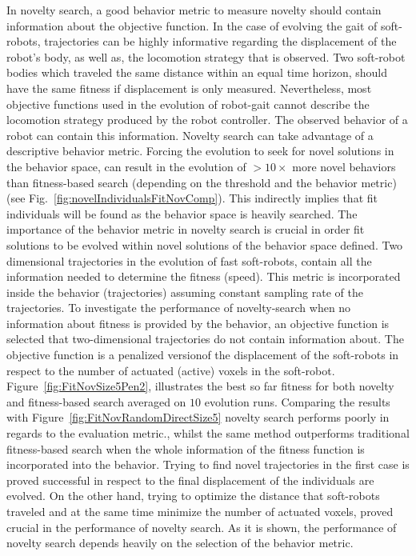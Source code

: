 In novelty search, a good behavior metric to measure novelty should contain information about the objective function. In the case of evolving the gait of soft-robots, trajectories can be highly informative regarding the displacement of the robot's body, as well as, the locomotion strategy that is observed. Two soft-robot bodies which traveled the same distance within an equal time horizon, should have the same fitness if displacement is only measured. Nevertheless, most objective functions used in the evolution of robot-gait cannot describe the locomotion strategy produced by the robot controller. The observed behavior of a robot can contain this information. Novelty search can take advantage of a descriptive behavior metric. Forcing the evolution to seek for  novel solutions in the behavior space, can result in the evolution of $>10 \times$ more novel behaviors than fitness-based search (depending on the threshold and the behavior metric) (see Fig.~\ref{fig:novelIndividualsFitNovComp}). This indirectly implies that fit individuals will be found as the behavior space is heavily searched. The importance of the behavior metric in novelty search is crucial in order fit solutions to be evolved within novel solutions of the behavior space defined. Two dimensional trajectories in the evolution of fast soft-robots, contain all the information needed to determine the fitness (speed). This metric is incorporated inside the behavior (trajectories) assuming constant sampling rate of the trajectories. To investigate the performance of novelty-search when no information about fitness is provided by the behavior, an objective function is selected that two-dimensional trajectories do not contain information about. The objective function is a penalized version\footnotemark of the displacement of the soft-robots in respect to the number of actuated (active) voxels in the soft-robot. Figure~\ref{fig:FitNovSize5Pen2}, illustrates the best so far fitness for both novelty and fitness-based search averaged on $10$ evolution runs. Comparing the results with Figure~\ref{fig:FitNovRandomDirectSize5} novelty search performs poorly in regards to the evaluation metric., whilst the same method outperforms traditional fitness-based search when the whole information of the fitness function is incorporated into the behavior. Trying to find novel trajectories in the first case is proved successful in respect to the final displacement of the individuals are evolved. On the other hand, trying to optimize the distance that soft-robots traveled and at the same time minimize the number of actuated voxels, proved crucial in the performance of novelty search. As it is shown, the performance of novelty search depends heavily on the selection of the behavior metric.


